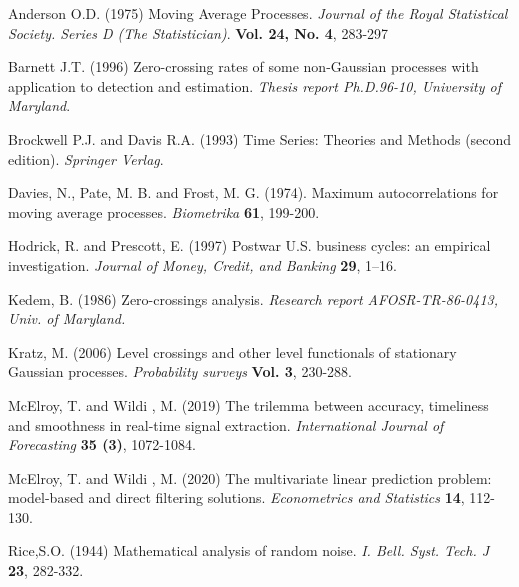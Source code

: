 \documentclass[a4paper]{article}
\begin{document}
%
\begin{thebibliography}{99}
%





\bibitem{} Anderson O.D. (1975) Moving Average Processes.  {\it Journal of the Royal Statistical Society. Series D (The Statistician)}. {\bf Vol. 24, No. 4}, 283-297


\bibitem{} Barnett J.T. (1996) Zero-crossing rates of some non-Gaussian processes with application to detection and estimation.  {\it Thesis report Ph.D.96-10, University of Maryland}.

\bibitem{} Brockwell P.J. and Davis R.A. (1993) Time Series: Theories and Methods (second edition).  {\it Springer Verlag}.




\bibitem{} Davies, N., Pate, M. B. and Frost, M. G. (1974). Maximum autocorrelations for moving average processes.  {\it Biometrika } {\bf 61}, 199-200.

\bibitem{} Hodrick, R. and Prescott, E. (1997) Postwar U.S. business
cycles: an empirical investigation.  {\it Journal of Money, Credit,
and Banking} {\bf 29}, 1--16.


\bibitem{} Kedem, B. (1986) Zero-crossings analysis.  {\it Research report AFOSR-TR-86-0413, Univ. of Maryland.}


\bibitem{} Kratz, M. (2006) Level crossings and other level functionals of stationary Gaussian processes.  {\it Probability surveys} {\bf Vol. 3}, 230-288.




\bibitem{} McElroy, T. and Wildi , M. (2019) The trilemma between accuracy, timeliness and smoothness in real-time signal extraction.  {\it International Journal of Forecasting  } {\bf 35 (3)}, 1072-1084.

\bibitem{} McElroy, T. and Wildi , M. (2020) The multivariate linear prediction problem: model-based and direct filtering solutions.  {\it Econometrics and Statistics } {\bf 14}, 112-130.



\bibitem{} Rice,S.O. (1944) Mathematical analysis of random noise.  {\it I. Bell. Syst. Tech. J } {\bf 23}, 282-332.




\end{thebibliography}
\end{document}
